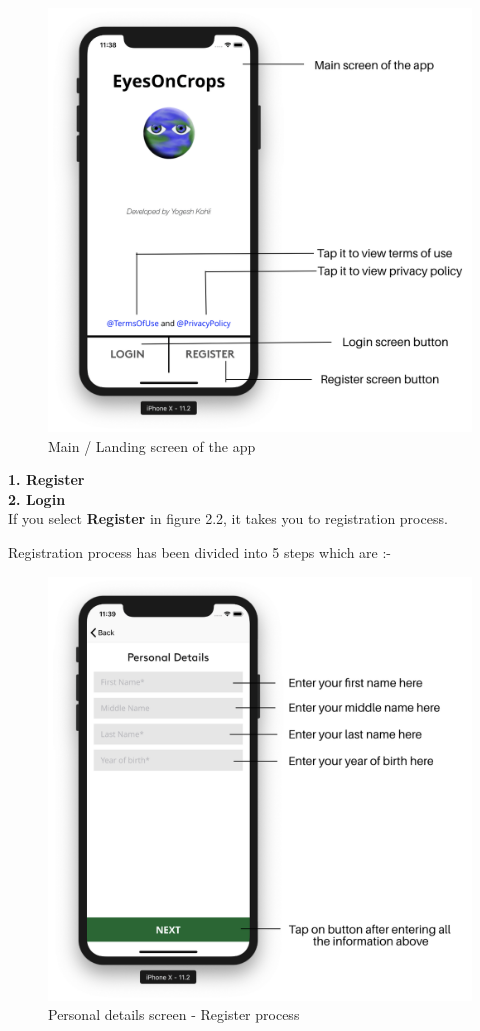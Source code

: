 \begin{itemize}
        \begin{figure}[H]
            \centering
            \includegraphics[width=0.50\linewidth]{figures/ch2/main_screen.png}
            \caption{\label{fig:main_screen} Main / Landing screen of the app}
        \end{figure}

    \textbf{1. Register} \\
    \textbf{2. Login} \\
    
    If you select \textbf{Register} in figure 2.2, it takes you to registration process.
    
    
    Registration process has been divided into 5 steps which are :-
    
    
        \begin{figure}[H]
            \centering
            \includegraphics[width=0.50\linewidth]{figures/ch2/register_personal.png}
            \caption{\label{fig:register_personal} Personal details screen - Register process}
        \end{figure}
  

\end{itemize}
